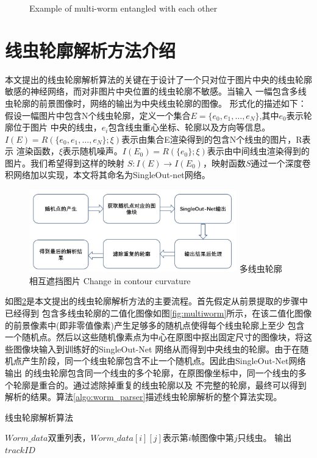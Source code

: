 \begin{figure}[!htp]
\begin{minipage}[t]{0.49\linewidth}
		\label{fig:freq}
	\end{minipage}
	{Example of multi-worm entangled with each other}%
	\label{fig:multi-worms}
	\end{figure}
	
\section{线虫轮廓解析方法介绍}
	本文提出的线虫轮廓解析算法的关键在于设计了一个只对位于图片中央的线虫轮廓敏感的神经网络，而对非图片中央位置的线虫轮廓不敏感。当输入
	一幅包含多线虫轮廓的前景图像时，网络的输出为中央线虫轮廓的图像。
	形式化的描述如下：假设一幅图片中包含N个线虫轮廓，定义一个集合$E =\{e_0,e_1,\dots,e_N\}$,其中$e_0$表示轮廓位于图片
	中央的线虫，$e_i$包含线虫重心坐标、轮廓以及方向等信息。$I(E)=R(\{e_0,e_1,\dots,e_N\};\xi)$表示由集合E渲染得到的包含N个线虫的图片，R表示
	渲染函数，$\xi$表示随机噪声。$I(E_0)=R(\{e_0\};\xi)$表示由中间线虫渲染得到的图片。我们希望得到这样的映射
	$S:I(E)\rightarrow I(E_0)$，映射函数$S$通过一个深度卷积网络加以实现，本文将其命名为SingleOut-net网络。
	\begin{figure}[htb]
	  \centering
	  \includegraphics[width=9cm]{figure/chap4/flow.jpg}
	  \bicaption
		{多线虫轮廓相互遮挡图片}
		{Change in contour curvature}
	  \label{fig:chap4:flow}
	\end{figure}
	
	如图\ref{fig:chap4:flow}是本文提出的线虫轮廓解析方法的主要流程。首先假定从前景提取的步骤中已经得到
	包含多线虫轮廓的二值化图像如图\ref{fig:multiworm}所示，在该二值化图像的前景像素中(即非零值像素)产生足够多的随机点使得每个线虫轮廓上至少
	包含一个随机点。然后以这些随机像素点为中心在原图中抠出固定尺寸的图像块，将这些图像块输入到训练好的SingleOut-Net
	网络从而得到中央线虫的轮廓。由于在随机点产生阶段，同一个线虫轮廓包含不止一个随机点。因此由SingleOut-Net网络输出
	的线虫轮廓包含同一个线虫的多个轮廓，在原图像坐标中，同一个线虫的多个轮廓是重合的。通过滤除掉重复的线虫轮廓以及
	不完整的轮廓，最终可以得到解析的结果。算法\ref{algo:worm_parser}描述线虫轮廓解析的整个算法实现。
\begin{algorithm}
\caption{线虫轮廓解析算法}
\label{algo:worm_parser}
\begin{algorithmic}[1]
\Require $Worm\_data$双重列表，$Worm\_data[i][j]$表示第$i$帧图像中第$j$只线虫。
\Ensure 输出$trackID$
\end{algorithmic}
\end{algorithm}

